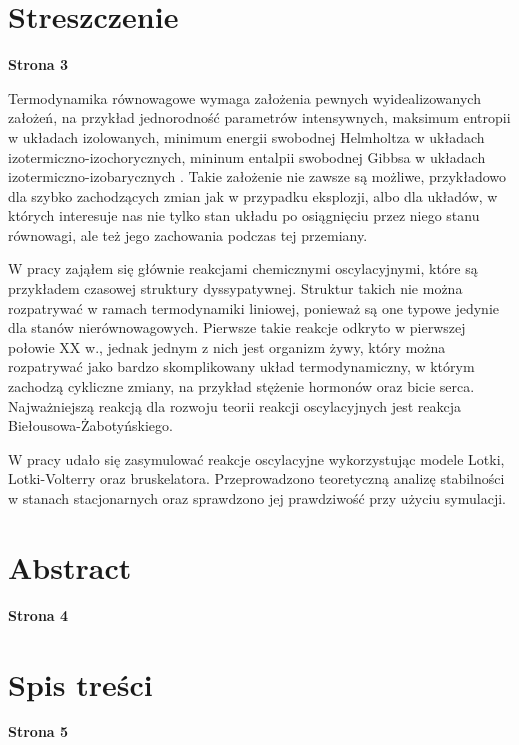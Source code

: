\documentclass[10pt, a4paper, twoside, onecolumn]{article}
\numberwithin{equation}{section}
\begin{document}
	\section*{Streszczenie}
	\begin{center}
		\textbf{Strona 3}
	\end{center}
	Termodynamika równowagowe wymaga założenia pewnych wyidealizowanych założeń, na przykład jednorodność parametrów intensywnych, maksimum entropii w układach izolowanych, minimum energii swobodnej Helmholtza w układach izotermiczno-izochorycznych, mininum entalpii swobodnej Gibbsa w układach izotermiczno-izobarycznych \cite{pudlik}. Takie założenie nie zawsze są możliwe, przykładowo dla szybko zachodzących zmian jak w przypadku eksplozji, albo dla układów, w których interesuje nas nie tylko stan układu po osiągnięciu przez niego stanu równowagi, ale też jego zachowania podczas tej przemiany. \par
	W pracy zająłem się głównie reakcjami chemicznymi oscylacyjnymi, które są przykładem czasowej struktury dyssypatywnej. Struktur takich nie można rozpatrywać w ramach termodynamiki liniowej, ponieważ są one typowe jedynie dla stanów nierównowagowych. Pierwsze takie reakcje odkryto w pierwszej połowie XX w., jednak jednym z nich jest organizm żywy, który można rozpatrywać jako bardzo skomplikowany układ termodynamiczny, w którym zachodzą cykliczne zmiany, na przykład stężenie hormonów oraz bicie serca. Najważniejszą reakcją dla rozwoju teorii reakcji oscylacyjnych jest reakcja Biełousowa-Żabotyńskiego. \par
	W pracy udało się zasymulować reakcje oscylacyjne wykorzystując modele Lotki, Lotki-Volterry oraz bruskelatora. Przeprowadzono teoretyczną analizę stabilności w stanach stacjonarnych oraz sprawdzono jej prawdziwość przy użyciu symulacji. 
	\pagebreak
	
	\section*{Abstract}
	\begin{center}
		\textbf{Strona 4}
	\end{center}
	\pagebreak
	
	\section*{Spis treści}
	\begin{center}
		\textbf{Strona 5}
	\end{center}
	\tableofcontents
	\pagebreak
	
\end{document}
